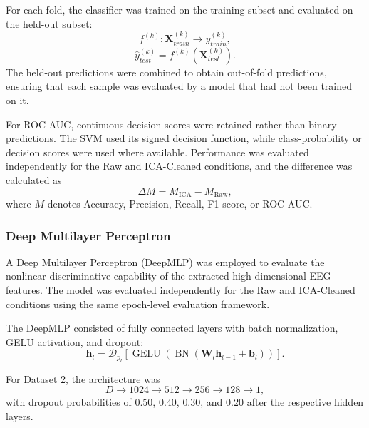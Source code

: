 \documentclass[conference]{IEEEtran}
\begin{document}
For each fold, the classifier was trained on the training subset and evaluated on the held-out subset:
\begin{equation}
f^{(k)}:
\mathbf{X}_{train}^{(k)}
\rightarrow
y_{train}^{(k)},
\end{equation}
\begin{equation}
\hat{y}_{test}^{(k)}
=
f^{(k)}
\left(\mathbf{X}_{test}^{(k)}\right).
\end{equation}
The held-out predictions were combined to obtain out-of-fold predictions, ensuring that each sample was evaluated by a model that had not been trained on it.

For ROC-AUC, continuous decision scores were retained rather than binary predictions. The SVM used its signed decision function, while class-probability or decision scores were used where available. Performance was evaluated independently for the Raw and ICA-Cleaned conditions, and the difference was calculated as
\begin{equation}
\Delta M
=
M_{\mathrm{ICA}}
-
M_{\mathrm{Raw}},
\end{equation}
where $M$ denotes Accuracy, Precision, Recall, F1-score, or ROC-AUC.

\subsubsection{Deep Multilayer Perceptron}

A Deep Multilayer Perceptron (DeepMLP) was employed to evaluate the nonlinear discriminative capability of the extracted high-dimensional EEG features. The model was evaluated independently for the Raw and ICA-Cleaned conditions using the same epoch-level evaluation framework.

The DeepMLP consisted of fully connected layers with batch normalization, GELU activation, and dropout:
\begin{equation}
\mathbf{h}_{l}
=
\mathcal{D}_{p_l}
\left[
\operatorname{GELU}
\left(
\operatorname{BN}
\left(
\mathbf{W}_{l}\mathbf{h}_{l-1}
+
\mathbf{b}_{l}
\right)
\right)
\right].
\end{equation}

For Dataset 2, the architecture was
\begin{equation}
D
\rightarrow
1024
\rightarrow
512
\rightarrow
256
\rightarrow
128
\rightarrow
1,
\end{equation}
with dropout probabilities of $0.50$, $0.40$, $0.30$, and $0.20$ after the respective hidden layers.
\end{document}
